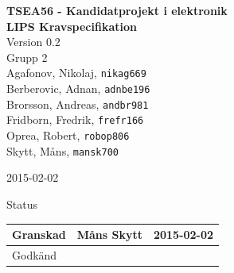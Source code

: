 \documentclass[11pt]{article}
\date{}
\begin{document}
\begin{titlepage}
\begin{center}
{\Large\bfseries TSEA56 - Kandidatprojekt i elektronik \\ LIPS Kravspecifikation}\\
%
\vspace{2\baselineskip}
%
Version 0.2\\
\vspace{2\baselineskip}
%
Grupp 2 \\
Agafonov, Nikolaj, 
\texttt{nikag669}
\\
Berberovic, Adnan, 
\texttt{adnbe196}
\\
Brorsson, Andreas, 
\texttt{andbr981}
\\
Fridborn, Fredrik, 
\texttt{frefr166}
\\
Oprea, Robert, 
\texttt{robop806}
\\
Skytt, Måns, 
\texttt{mansk700}

\vspace{2\baselineskip}
2015-02-02

\vspace{25\baselineskip}
Status
\begin{longtable}{|l|l|l|} \hline

Granskad &
Måns Skytt &
2015-02-02 \\ \hline
Godkänd &
 &
 \\ \hline
 
\end{longtable}

\end{center}
\end{titlepage}
\end{document}
